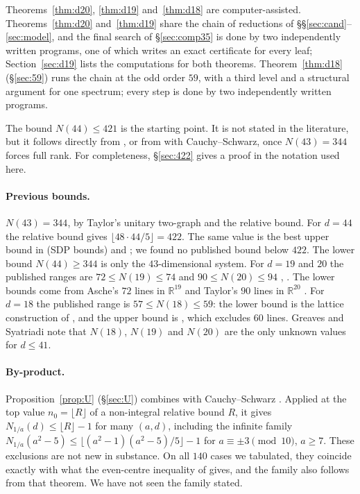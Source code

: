 \documentclass[11pt]{article}
\theoremstyle{definition}
\newcommand{\R}{\mathbb{R}}
\begin{document}
Theorems~\ref{thm:d20}, \ref{thm:d19} and~\ref{thm:d18} are computer-assisted. Theorems~\ref{thm:d20}
and~\ref{thm:d19} share the chain of reductions of \S\S\ref{sec:cand}--\ref{sec:model}, and the final
search of \S\ref{sec:comp35} is done by two independently written programs, one of which writes an
exact certificate for every leaf; Section~\ref{sec:d19} lists the computations for both theorems.
Theorem~\ref{thm:d18} (\S\ref{sec:59}) runs the chain at the odd order $59$, with a third level and a
structural argument for one spectrum; every step is done by two independently written programs.

The bound $N(44)\le421$ is the starting point. It is not stated in the literature, but it follows
directly from \cite[Thm.~5.21 and Cor.~3.6]{GKMS16}, or from \cite[Lemma~3.1]{GSY21} with
Cauchy--Schwarz, once $N(43)=344$ forces full rank. For completeness, \S\ref{sec:422} gives a
proof in the notation used here.

\paragraph{Previous bounds.} $N(43)=344$, by Taylor's unitary two-graph \cite{Taylor} and the
relative bound. For $d=44$ the relative bound gives $\lfloor48\cdot44/5\rfloor=422$. The same
value is the best upper bound in \cite[Table~3]{BY14} (SDP bounds) and \cite[Thm.~8]{KT19}; we
found no published bound below $422$. The lower bound $N(44)\ge344$ is only the $43$-dimensional
system. For $d=19$ and $20$ the published ranges are $72\le N(19)\le74$ and $90\le N(20)\le94$
\cite[Thms.~5.2, 5.5]{GSY21}, \cite[Table~1]{GS24}. The lower bounds come from Asche's $72$ lines in
$\R^{19}$ \cite{Szo19} and Taylor's $90$ lines in $\R^{20}$ \cite{Tay71}. For $d=18$ the published
range is $57\le N(18)\le59$: the lower bound is the lattice construction of \cite{GSY23}, and the
upper bound is \cite{GS24}, which excludes $60$ lines. Greaves and Syatriadi
\cite{GS24} note that $N(18)$, $N(19)$ and $N(20)$ are the only unknown values for $d\le41$.

\paragraph{By-product.} Proposition~\ref{prop:U} (\S\ref{sec:U}) combines
\cite[Lemma~3.1]{GSY21} with Cauchy--Schwarz \cite[Thm.~5.6]{GKMS16}. Applied at the top value
$n_0=\lfloor R\rfloor$ of a non-integral relative bound $R$, it gives
$N_{1/a}(d)\le\lfloor R\rfloor-1$ for many $(a,d)$, including the infinite family
$N_{1/a}(a^2-5)\le\lfloor(a^2-1)(a^2-5)/5\rfloor-1$ for $a\equiv\pm3\pmod{10}$, $a\ge7$.
These exclusions are not new in substance. On all $140$ cases we tabulated, they coincide exactly
with what the even-centre inequality of \cite[Thm.~5.21]{GKMS16} gives, and the family also follows
from that theorem. We have not seen the family stated.
\end{document}
